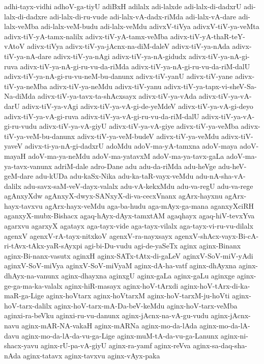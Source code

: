 {adhi-tayx-vidhi
adhoV-ga-tiyU
adiBxH
adilalx
adi-lalxde
adi-lalx-di-dadxrU
adi-lalx-di-dadxre
adi-lalx-di-ru-vude
adi-lalx-vA-dadx-riMda
adi-lalx-vA-dare
adi-lalx-veMba
adi-lalx-veM-budu
adi-lalx-veMdu
adivxV-tiVya
adivxV-tiV-ya-veMta
adivx-tiV-yA-tamx-nalilx
adivx-tiV-yA-tamx-veMba
adivx-tiV-yA-thaR-teY-vAtoV
adivx-tiVya
adivx-tiV-ya-jAcnx-na-diM-daleV
adivx-tiV-ya-nAda
adivx-tiV-ya-nA-dare
adivx-tiV-ya-nAgi
adivx-tiV-ya-nA-gidudx
adivx-tiV-ya-nA-gi-ruva
adivx-tiV-ya-nA-gi-ru-vu-da-riMda
adivx-tiV-ya-nA-gi-ru-vu-da-riM-dalU
adivx-tiV-ya-nA-gi-ru-vu-neM-bu-danunx
adivx-tiV-yanU
adivx-tiV-yane
adivx-tiV-ya-neMba
adivx-tiV-ya-neMdu
adivx-tiV-yanu
adivx-tiV-ya-tapx-vi-sheV-Sa-Na-diMda
adivx-tiV-ya-tavx-ta-shAcxsayx
adivx-tiV-ya-vAda
adivx-tiV-ya-vA-darU
adivx-tiV-ya-vAgi
adivx-tiV-ya-vA-gi-de-yeMdeV
adivx-tiV-ya-vA-gi-deyo
adivx-tiV-ya-vA-gi-ruva
adivx-tiV-ya-vA-gi-ru-vu-da-riM-dalU
adivx-tiV-ya-vA-gi-ru-vudu
adivx-tiV-ya-vA-giyU
adivx-tiV-ya-vA-giye
adivx-tiV-ya-veMba
adivx-tiV-ya-veM-bu-danunx
adivx-tiV-ya-veM-budeV
adivx-tiV-ya-veMdu
adivx-tiV-yaveV
adivx-ti-ya-nA-gi-dadxrU
adoMdu
adoV-ma-yA-tamxna
adoV-maya
adoV-mayaH
adoV-ma-ya-neMdu
adoV-ma-yatavxM
adoV-ma-ya-tavx-gaLa
adoV-ma-ya-tavx-vanunx
adriM-dale
adro-Dane
adu
adu-da-riMda
adu-heVge
adu-heV-geM-dare
adu-kUDa
adu-kaSx-Nika
adu-ka-taR-vayx-veMdu
adu-nA-sha-vA-dalilx
adu-savx-saM-veV-dayx-valalx
adu-vA-kekxMdu
adu-va-regU
adu-va-rege
agAnxyXdw
agAnxyX-dwyx-SANxyX-di-va-cecxVnanx
agArx-hayxnu
agArx-hayx-tavxvu
agArx-hayx-veMdu
aga-ba-hudu
aga-mAyx-ga-mana
aganxyXciRH
aganxyX-mubx-Bishacx
agaq-hAyx-dAyx-tamxtAM
agaqhayx
agaq-hiV-tevxYva
agarxvu
agarxyX
agatayx
aga-tayx-vide
aga-tayx-vilalx
aga-tayx-vi-ru-vu-dilalx
agenxV
agenxV-rA-tayx-nitxkoV
agenxV-ra-nayxsayx
agenxV-shAcx-vayx-Bi-cA-ri-tAvx-tAkx-yaR-sAyxpi
agi-bi-Du-vudu
agi-de-yaSeTx
aginx
aginx-Binanx
aginx-Bi-nanx-vasutx
aginxH
aginx-SATx-tAtx-di-gaLeV
aginxV-SoV-miV-yAdi
aginxV-SoV-miVya
aginxV-SoV-miVyaM
aginx-dA-ha-vatf
aginx-dhAyxna
aginx-dhAyx-na-vanunx
aginx-dhayxna
aginxgU
aginx-gaLa
aginx-gaLu
aginxge
aginx-ge-ga-ma-ka-valalx
aginx-hiR-masayx
aginx-hoV-tArxdi
aginx-hoV-tArx-di-ka-maR-ga-Lige
aginx-hoVtarx
aginx-hoVtarxM
aginx-hoV-tarxM-ju-hoVti
aginx-hoV-tarx-dalilx
aginx-hoV-tarx-mA-Da-beV-keMdu
aginx-hoV-tarx-veMba
aginxi-ra-beVku
aginxi-ru-vu-danunx
aginx-jAcnx-na-vA-gu-vudu
aginx-jAcnx-navu
aginx-mAR-NA-vakaH
aginx-mARNa
aginx-mo-da-lAda
aginx-mo-da-lA-davu
aginx-mo-da-lA-da-vu-ga-Lige
aginx-muM-tA-da-vu-ga-Lanunx
aginx-ni-shacx-yavu
aginx-rU-pa-vA-giyU
aginx-ra-yamf
aginx-reVva
aginx-sa-daq-sha-nAda
aginx-tatavx
aginx-tavxvu
aginx-vAyx-paka
}
